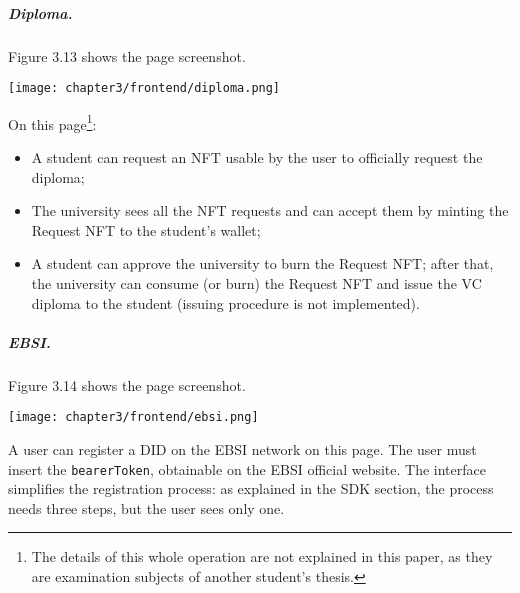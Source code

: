 \vspace{1cm}
\subparagraph{Diploma.} Figure 3.13 shows the page screenshot.
\begin{center}
    \begin{tcolorbox}[
        beamer,
        width=0.6\textheight,
        arc=0pt,
        boxsep=0pt,
        left=0pt,right=0pt,top=0pt,bottom=0pt,
        ]
    \texttt{[image: chapter3/frontend/diploma.png]}
    \end{tcolorbox}
\end{center}
\clearpage
On this page\footnote{The details of this whole operation are not explained in this paper,
as they are examination subjects of another student's thesis.}:
\begin{itemize}
    \item A student can request an NFT usable by the user to officially request the diploma;
    \item The university sees all the NFT requests and can accept them by minting
    the Request NFT to the student's wallet;
    \item A student can approve the university to burn the Request NFT; after that,
    the university can consume (or burn) the Request NFT and issue the VC diploma to 
    the student (issuing procedure is not implemented).
\end{itemize}

\vspace{1cm}
\subparagraph{EBSI.} Figure 3.14 shows the page screenshot.
\begin{center}
    \begin{tcolorbox}[
        beamer,
        width=0.6\textheight,
        arc=0pt,
        boxsep=0pt,
        left=0pt,right=0pt,top=0pt,bottom=0pt,
        ]
    \texttt{[image: chapter3/frontend/ebsi.png]}
    \end{tcolorbox}
\end{center}
\vspace{0.3cm}
A user can register a DID on the EBSI network on this page. The user must insert
the \texttt{bearerToken}, obtainable on the EBSI official website. The interface
simplifies the registration process: as explained in the SDK section,
the process needs three steps, but the user sees only one.

\clearpage
